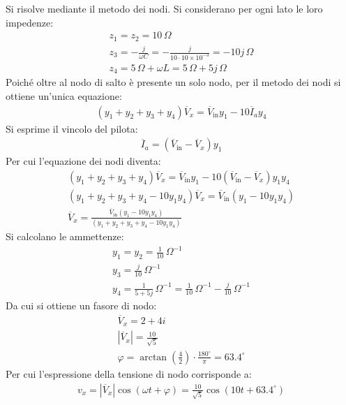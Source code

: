 \documentclass{article}
\begin{document}
Si risolve mediante il metodo dei nodi. Si considerano per ogni lato le loro impedenze:
\begin{gather*}
    z_1=z_2=10\,\Omega\\
    z_3=\displaystyle-\frac{j}{\omega C}=-\frac{j}{10\cdot 10\times10^{-3}}=-10j\,\Omega\\
    z_4=5\,\Omega+\omega L=5\,\Omega+5j\,\Omega
\end{gather*}
Poiché oltre al nodo di salto è presente un solo nodo, per il metodo dei nodi si ottiene un'unica equazione:
\begin{gather*}
    (y_1+y_2+y_3+y_4)\overline{V}_x=\overline{V}_\mathrm{in}y_1-10\overline{I}_ay_4
\end{gather*}
Si esprime il vincolo del pilota:
\begin{gather*}
    \overline{I}_a=(\overline{V}_\mathrm{in}-\overline{V}_x)y_1
\end{gather*}
Per cui l'equazione dei nodi diventa:
\begin{gather*}
    (y_1+y_2+y_3+y_4)\overline{V}_x=\overline{V}_\mathrm{in}y_1-10(\overline{V}_\mathrm{in}-\overline{V}_x)y_1y_4\\
    (y_1+y_2+y_3+y_4-10y_1y_4)\overline{V}_x=\overline{V}_\mathrm{in}(y_1-10y_1y_4)\\
    \overline{V}_{x}=\displaystyle\frac{\overline{V}_\mathrm{in}(y_1-10y_1y_4)}{(y_1+y_2+y_3+y_4-10y_1y_4)}
\end{gather*}
Si calcolano le ammettenze:
\begin{gather*}
    y_1=y_2=\displaystyle\frac{1}{10}\,\Omega^{-1}\\
    y_3=\displaystyle\frac{j}{10}\,\Omega^{-1}\\
    y_4=\displaystyle\frac{1}{5+5j}\,\Omega^{-1}=\frac{1}{10}\,\Omega^{-1}-\frac{j}{10}\,\Omega^{-1}
\end{gather*}
Da cui si ottiene un fasore di nodo:
\begin{gather*}
    \overline{V}_x=2+4i\\
    |\overline{V}_x|=\displaystyle\frac{10}{\sqrt{5}}\\
    \varphi=\arctan\left(\displaystyle\frac{4}{2}\right)\cdot\frac{180^{\circ}}{\pi}=63.4^{\circ}
\end{gather*}
Per cui l'espressione della tensione di nodo corrisponde a:
\begin{gather}
    v_x=|\overline{V}_x|\cos(\omega t+\varphi)=\displaystyle\frac{10}{\sqrt{5}}\cos(10t+63.4^{\circ})
\end{gather}
\end{document}
